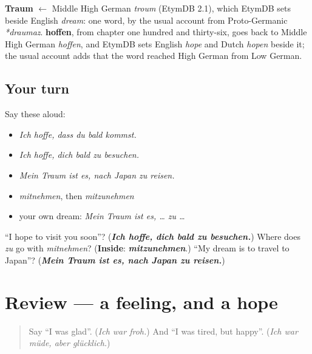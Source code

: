 \begin{cousinweb}
\textbf{Traum} $\leftarrow$ Middle High German \emph{troum} (EtymDB 2.1), which EtymDB sets beside English \emph{dream}: one word, by the usual account from Proto-Germanic \emph{*draumaz}. \textbf{hoffen}, from chapter one hundred and thirty-six, goes back to Middle High German \emph{hoffen}, and EtymDB sets English \emph{hope} and Dutch \emph{hopen} beside it; the usual account adds that the word reached High German from Low German.
\end{cousinweb}

\subsection*{Your turn}
Say these aloud:

\begin{itemize}
\raggedright
  \item \emph{Ich hoffe, dass du bald kommst.}
  \item \emph{Ich hoffe, dich bald zu besuchen.}
  \item \emph{Mein Traum ist es, nach Japan zu reisen.}
  \item \emph{mitnehmen}, then \emph{mitzunehmen}
  \item your own dream: \emph{Mein Traum ist es, … zu …}
\end{itemize}

\begin{tcolorbox}[breakable,colback=teal!4,colframe=teal!35!black,title={Before you move on}]
\textquotedblleft{}I hope to visit you soon\textquotedblright{}? (\emph{\textbf{Ich hoffe, dich bald zu besuchen.}}) Where does \emph{zu} go with \emph{mitnehmen}? (\textbf{Inside}: \emph{\textbf{mitzunehmen}}.) \textquotedblleft{}My dream is to travel to Japan\textquotedblright{}? (\emph{\textbf{Mein Traum ist es, nach Japan zu reisen.}})
\end{tcolorbox}
\section[(review)]{Review — a feeling, and a hope}

\label{lesson:GE-C258-review}



\begin{quote}
Say \textquotedblleft{}I was glad\textquotedblright{}. (\emph{Ich war froh.}) And \textquotedblleft{}I was tired, but happy\textquotedblright{}. (\emph{Ich war müde, aber glücklich.})
\end{quote}

